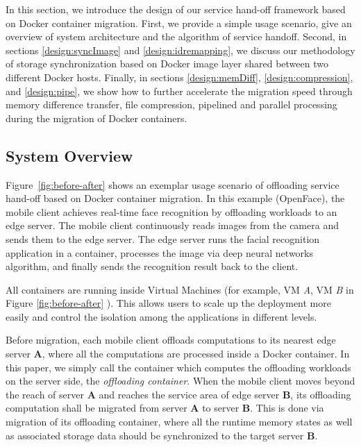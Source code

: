 



In this section, we introduce the design of our service hand-off framework based on Docker container migration. First, we provide a simple usage scenario, give an overview of system architecture and the algorithm of service handoff. Second, in sections \ref{design:syncImage} and \ref{design:idremapping}, we discuss our methodology of storage synchronization based on Docker image layer shared between two different Docker hosts. Finally, in sections \ref{design:memDiff}, \ref{design:compression}, and \ref{design:pipe}, we show how to further accelerate the migration speed through memory difference transfer, file compression, pipelined and parallel processing during the migration of Docker containers.

\subsection{System Overview}

Figure~\ref{fig:before-after} shows an exemplar usage scenario of offloading service hand-off based on Docker container migration. 
In this example (OpenFace\cite{openface2016}), the mobile client achieves real-time face recognition by offloading workloads to an edge server. 
The mobile client continuously reads images from the camera and sends them to the edge server. 
The edge server runs the facial recognition application in a container, processes the image via deep neural networks algorithm, and finally sends the recognition result  back to the client. 

All containers are running inside Virtual Machines (for example, VM \textit{A}, VM \textit{B} in Figure \ref{fig:before-after} ). This allows users to scale up the deployment more easily and control the isolation among the applications in different levels.


Before migration, each mobile client offloads computations to its nearest edge server \textbf{A}, where all the computations are processed inside a Docker container. 
In this paper, we simply call the container which computes the offloading workloads on the server side, the \textit{offloading container}.
When the mobile client moves beyond the reach of server \textbf{A} and reaches the service area of edge server \textbf{B}, its offloading computation shall be migrated from server \textbf{A} to server \textbf{B}. This is done via migration of its offloading container, where all the runtime memory states as well as associated storage data should be synchronized to the target server \textbf{B}.

